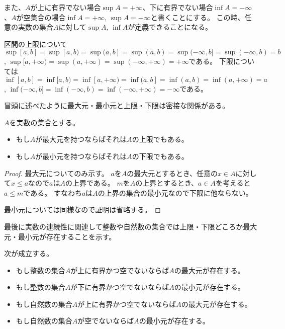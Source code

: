 また、$A$が上に有界でない場合$\sup A = +\infty$、下に有界でない場合$\inf A = -\infty$、$A$が空集合の場合$\inf A = +\infty$, $\sup A = -\infty$と書くことにする。
この時、任意の実数の集合$A$に対して$\sup A$, $\inf A$が定義できることになる。

\begin{example}
区間の上限について
$\sup [a, b] = \sup [a, b) = \sup (a, b] = \sup (a, b) = \sup (-\infty, b] = \sup (-\infty, b) = b$, $\sup [a, +\infty) = \sup (a, +\infty) = \sup (-\infty, +\infty) = +\infty$である。
下限については
$\inf [a, b] = \inf [a, b) = \inf [a, +\infty) = \inf (a, b] = \inf (a, b) = \inf (a, +\infty) = a$, $\inf (-\infty, b] = \inf (-\infty, b) = \inf (-\infty, +\infty) = -\infty$である。
\end{example}

冒頭に述べたように最大元・最小元と上限・下限は密接な関係がある。

\begin{theorem}
$A$を実数の集合とする。
\begin{itemize}
\item
もし$A$が最大元を持つならばそれは$A$の上限でもある。
\item
もし$A$が最小元を持つならばそれは$A$の下限でもある。
\end{itemize}
\end{theorem}

\begin{proof}
最大元についてのみ示す。
$a$を$A$の最大元とするとき、任意の$x \in A$に対して$x \le a$なので$a$は$A$の上界である。
$m$を$A$の上界とするとき、$a \in A$を考えると$a \le m$である。
すなわち$a$は$A$の上界の集合の最小元なので下限に他ならない。

最小元については同様なので証明は省略する。
\end{proof}

最後に実数の連続性に関連して整数や自然数の集合では上限・下限どころか最大元・最小元が存在することを示す。

\begin{proposition}
\label{t_maxdisc}
次が成立する。
\begin{itemize}
\item
もし整数の集合$A$が上に有界かつ空でないならば$A$の最大元が存在する。
\item
もし整数の集合$A$が下に有界かつ空でないならば$A$の最小元が存在する。
\item
もし自然数の集合$A$が上に有界かつ空でないならば$A$の最大元が存在する。
\item
もし自然数の集合$A$が空でないならば$A$の最小元が存在する。
\end{itemize}
\end{proposition}

